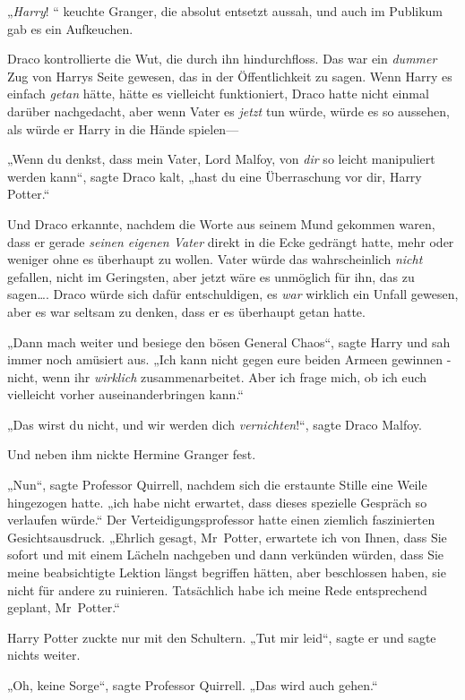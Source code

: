 {„\emph{Harry}! “ keuchte Granger, die absolut entsetzt aussah, und auch im Publikum gab es ein Aufkeuchen.

Draco kontrollierte die Wut, die durch ihn hindurchfloss. Das war ein \emph{dummer} Zug von Harrys Seite gewesen, das in der Öffentlichkeit zu sagen. Wenn Harry es einfach \emph{getan} hätte, hätte es vielleicht funktioniert, Draco hatte nicht einmal darüber nachgedacht, aber wenn Vater es \emph{jetzt} tun würde, würde es so aussehen, als würde er Harry in die Hände spielen—

„Wenn du denkst, dass mein Vater, Lord Malfoy, von \emph{dir} so leicht manipuliert werden kann“, sagte Draco kalt, „hast du eine Überraschung vor dir, Harry Potter.“

Und Draco erkannte, nachdem die Worte aus seinem Mund gekommen waren, dass er gerade \emph{seinen eigenen Vater} direkt in die Ecke gedrängt hatte, mehr oder weniger ohne es überhaupt zu wollen. Vater würde das wahrscheinlich \emph{nicht} gefallen, nicht im Geringsten, aber jetzt wäre es unmöglich für ihn, das zu sagen…. Draco würde sich dafür entschuldigen, es \emph{war} wirklich ein Unfall gewesen, aber es war seltsam zu denken, dass er es überhaupt getan hatte.

„Dann mach weiter und besiege den bösen General Chaos“, sagte Harry und sah immer noch amüsiert aus. „Ich kann nicht gegen eure beiden Armeen gewinnen - nicht, wenn ihr \emph{wirklich} zusammenarbeitet. Aber ich frage mich, ob ich euch vielleicht vorher auseinanderbringen kann.“

„Das wirst du nicht, und wir werden dich \emph{vernichten}!“, sagte Draco Malfoy.

Und neben ihm nickte Hermine Granger fest.

„Nun“, sagte Professor Quirrell, nachdem sich die erstaunte Stille eine Weile hingezogen hatte. „ich habe nicht erwartet, dass dieses spezielle Gespräch so verlaufen würde.“ Der Verteidigungsprofessor hatte einen ziemlich faszinierten Gesichtsausdruck. „Ehrlich gesagt, Mr~Potter, erwartete ich von Ihnen, dass Sie sofort und mit einem Lächeln nachgeben und dann verkünden würden, dass Sie meine beabsichtigte Lektion längst begriffen hätten, aber beschlossen haben, sie nicht für andere zu ruinieren. Tatsächlich habe ich meine Rede entsprechend geplant, Mr~Potter.“

Harry Potter zuckte nur mit den Schultern. „Tut mir leid“, sagte er und sagte nichts weiter.

„Oh, keine Sorge“, sagte Professor Quirrell. „Das wird auch gehen.“

}
